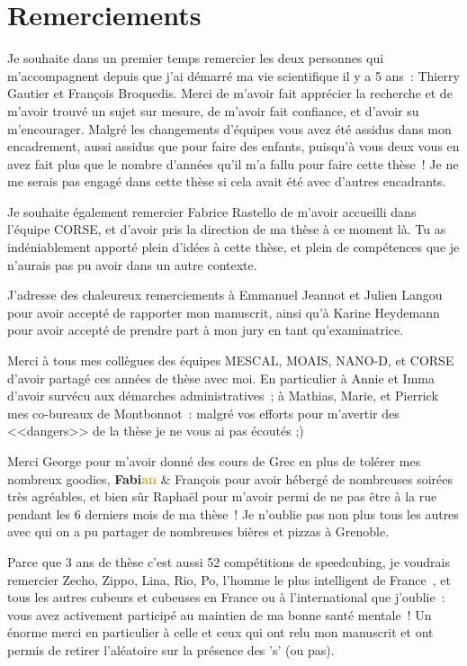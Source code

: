 \chapter*{Remerciements}

Je souhaite dans un premier temps remercier les deux personnes qui m'accompagnent depuis que j'ai démarré ma vie scientifique il y a 5 ans~: Thierry Gautier et François Broquedis.
Merci de m'avoir fait apprécier la recherche et de m'avoir trouvé un sujet sur mesure, de m'avoir fait confiance, et d'avoir su m'encourager.
Malgré les changements d'équipes vous avez été assidus dans mon encadrement, aussi assidus que pour faire des enfants, puisqu'à vous deux vous en avez fait plus que le nombre d'années qu'il m'a fallu pour faire cette thèse~!
Je ne me serais pas engagé dans cette thèse si cela avait été avec d'autres encadrants.

Je souhaite également remercier Fabrice Rastello de m'avoir accueilli dans l'équipe CORSE, et d'avoir pris la direction de ma thèse à ce moment là.
Tu as indéniablement apporté plein d'idées à cette thèse, et plein de compétences que je n'aurais pas pu avoir dans un autre contexte.

J'adresse des chaleureux remerciements à Emmanuel Jeannot et Julien Langou  pour avoir accepté de rapporter mon manuscrit, ainsi qu'à Karine Heydemann pour avoir accepté de prendre part à mon jury en tant qu'examinatrice.

Merci à tous mes collègues des équipes MESCAL, MOAIS, NANO-D, et CORSE d'avoir partagé ces années de thèse avec moi.
En particulier à Annie et Imma d'avoir survécu aux démarches administratives~; à Mathias, Marie, et Pierrick mes co-bureaux de Montbonnot~: malgré vos efforts pour m'avertir des <<dangers>> de la thèse je ne vous ai pas écoutés ;)

Merci
George pour m'avoir donné des cours de Grec en plus de tolérer mes nombreux goodies, \textbf{Fa\textcolor{BrickRed}{bi}\textcolor{Goldenrod}{an}} \& François pour avoir hébergé de nombreuses soirées très agréables, et bien sûr Raphaël pour m'avoir permi de ne pas être à la rue pendant les 6 derniers mois de ma thèse~! Je n'oublie pas non plus tous les autres avec qui on a pu partager de nombreuses bières et pizzas à Grenoble.

Parce que 3 ans de thèse c'est aussi 52 compétitions de speedcubing, je voudrais remercier Zecho, Zippo, Lina, Rio, Po, l'homme le plus intelligent de France~\cite{TF1}, et tous les autres cubeurs et cubeuses en France ou à l'international que j'oublie~: vous avez activement participé au maintien de ma bonne santé mentale~!
Un énorme merci en particulier à celle et ceux qui ont relu mon manuscrit et ont permis de retirer l'aléatoire sur la présence des 's' (ou pas).

